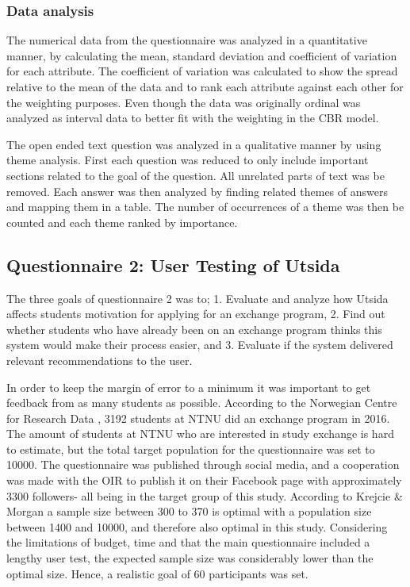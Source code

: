 \subsubsection{Data analysis}
The numerical data from the questionnaire was analyzed in a quantitative manner, by calculating the mean, standard deviation and coefficient of variation for each attribute. The coefficient of variation was calculated to show the spread relative to the mean of the data and to rank each attribute against each other for the weighting purposes. Even though the data was originally ordinal was analyzed as interval data to better fit with the weighting in the CBR model. 

The open ended text question was analyzed in a qualitative manner by using theme analysis. First each question was reduced to only include important sections related to the goal of the question. All unrelated parts of text was be removed. Each answer was then analyzed by finding related themes of answers and mapping them in a table. The number of occurrences of a theme was then be counted and each theme ranked by importance. 

\subsection{Questionnaire 2: User Testing of Utsida}\label{sec:questionnaire_2}

The three goals of questionnaire 2 was to; 1. Evaluate and analyze how Utsida affects students motivation for applying for an exchange program, 2. Find out whether students who have already been on an exchange program thinks this system would make their process easier, and 3. Evaluate if the system delivered relevant recommendations to the user.

In order to keep the margin of error to a minimum it was important to get feedback from as many students as possible. According to the Norwegian Centre for Research Data \cite{utvekslingsopphold}, 3192 students at NTNU did an exchange program in 2016. The amount of students at NTNU who are interested in study exchange is hard to estimate, but the total target population for the questionnaire was set to 10000. The questionnaire was published through social media, and a cooperation was made with the OIR to publish it on their Facebook page with approximately 3300 followers- all being in the target group of this study. According to Krejcie \& Morgan \cite{krejcie1970determining} a sample size between 300 to 370 is optimal with a population size between 1400 and 10000, and therefore also optimal in this study. Considering the limitations of budget, time and that the main questionnaire included a lengthy user test, the expected sample size was considerably lower than the optimal size. Hence, a realistic goal of 60 participants was set.

